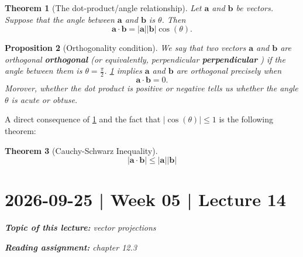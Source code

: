 \documentclass[10pt]{article}
\DeclareRobustCommand{\demph}[1]{%
  \ifmmode
  {\color{Blue}#1}%
  \else
  {\color{Blue}\bfseries\slshape #1}%
  \fi
}
\newtheorem{theorem}{Theorem}
\newtheorem{proposition}[theorem]{Proposition}
\theoremstyle{definition}
\newcommand{\1}[1]{\textbf{1}_{\left[#1\right]}} %
\begin{document}
\begin{theorem}[The dot-product/angle relationship]
  \label{thm:dot-productangle-relationship}
  Let $\mathbf{a}$ and $\mathbf{b}$ be vectors. Suppose that the angle between $\mathbf{a}$ and $\mathbf{b}$ is
  $\theta$. Then
  \begin{equation*}
    \mathbf{a}\cdot \mathbf{b} = | \mathbf{a} | |\mathbf{b}| \cos(\theta).
  \end{equation*}
\end{theorem}

\begin{proposition}[Orthogonality condition]
  We say that two vectors $\mathbf{a}$ and $\mathbf{b}$ are \demph{orthogonal} (or equivalently,
  \demph{perpendicular}) if the angle between them is $\theta=\frac{\pi}{2}$.
  \cref{thm:dot-productangle-relationship} implies $\mathbf{a}$ and $\mathbf{b}$ are orthogonal precisely
  when
  \begin{equation*}
    \mathbf{a}\cdot \mathbf{b} = 0.
  \end{equation*}
  Morover, whether the dot product is positive or negative tells us whether the angle $\theta$ is acute
  or obtuse.
\end{proposition}

A direct consequence of \cref{thm:dot-productangle-relationship} and the fact that $\left| \cos(\theta)
\right| \leq 1$ is the following theorem:

\begin{theorem}[Cauchy-Schwarz Inequality]
  \label{thm:cauchy-shwarz-inequality}
  \begin{equation*}
    | \mathbf{a}\cdot \mathbf{b} | \leq | \mathbf{a} || \mathbf{b} |
  \end{equation*}
\end{theorem}




\newpage

\section{2026-09-25 | Week 05 | Lecture 14}

\begin{center}
  \begin{tcolorbox}[width=0.9\textwidth, colback=white, colframe=black]
    \textit{\textbf{Topic of this lecture:} vector projections}

    \textit{\textbf{Reading assignment:} chapter 12.3}
  \end{tcolorbox}
\end{center}
\end{document}
